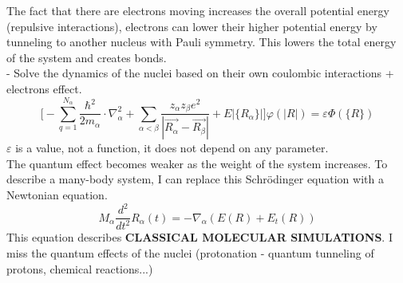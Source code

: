 The fact that there are electrons moving increases the overall potential energy (repulsive interactions), electrons can lower their higher potential energy by tunneling to another nucleus with Pauli symmetry. This lowers the total energy of the system and creates bonds.\\
- Solve the dynamics of the nuclei based on their own coulombic interactions + electrons effect.
\[
\bigg[-\sum_{q=1}^{N_{\alpha}}\frac{\hbar^2}{2m_{\alpha}}\cdot\nabla_{\alpha}^2
+\sum_{\alpha<\beta}\frac{z_{\alpha}z_{\beta}e^2}{|\vec{R_{\alpha}}-\vec{R_{\beta}}|}+E|\{R_\alpha\}| \bigg]\varphi(|R|)=\varepsilon\varPhi(\{R\})
\]
$\varepsilon$ is a value, not a function, it does not depend on any parameter.\\
The quantum effect becomes weaker as the weight of the system increases. To describe a many-body system, I can replace this Schr\"odinger equation with a Newtonian equation.\\
\[
M_\alpha\frac{d^2}{dt^2}R_\alpha(t)=-\nabla_\alpha(E(R)+E_t(R))
\]
This equation describes \textbf{CLASSICAL MOLECULAR SIMULATIONS}. I miss the quantum effects of the nuclei (protonation - quantum tunneling of protons, chemical reactions...)\\
